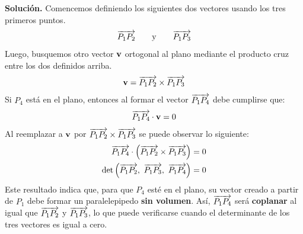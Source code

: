 \documentclass[12pt]{article}
\begin{document}
\textbf{Solución.} Comencemos definiendo los siguientes dos vectores usando los tres primeros puntos.
\[
  \overrightarrow{P_{1}P_{2}} \qquad \text{y} \qquad \overrightarrow{P_{1}P_{3}}
\]
Luego, busquemos otro vector $\mathbf{v}$ ortogonal al plano mediante el producto cruz entre los dos definidos arriba.
\[
  \mathbf{v} = \overrightarrow{P_{1}P_{2}} \times \overrightarrow{P_{1}P_{3}}
\]
Si $P_{4}$ está en el plano, entonces al formar el vector $\overrightarrow{P_{1}P_{4}}$ debe cumplirse que:
\[
  \overrightarrow{P_{1}P_{4}} \cdot \mathbf{v} = 0
\]
Al reemplazar a $\mathbf{v}$ por $\overrightarrow{P_{1}P_{2}} \times \overrightarrow{P_{1}P_{3}}$ se puede observar lo siguiente:
\begin{align*}
  \overvec{P_{1}P_{4}} \cdot \left(\overvec{P_{1}P_{2}} \times \overvec{P_{1}P_{3}}\right) &= 0 \\
     \det\left(\overvec{P_{1}P_{2}}, \ \overvec{P_{1}P_{3}}, \ \overvec{P_{1}P_{4}}\right) &= 0
\end{align*}
Este resultado indica que, para que $P_{4}$ esté en el plano, su vector creado a partir de $P_{1}$ debe formar un paralelepipedo \textbf{sin volumen}. Así, $\overrightarrow{P_{1}P_{4}}$ será \textbf{coplanar} al igual que $\overrightarrow{P_{1}P_{2}}$ y $\overrightarrow{P_{1}P_{3}}$, lo que puede verificarse cuando el determinante de los tres vectores es igual a cero.
\end{document}
